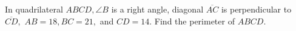 In quadrilateral $ABCD, \angle B$ is a right angle, diagonal $\overline{AC}$ is perpendicular to $\overline{CD},$ $AB=18, BC=21,$ and $CD=14.$  Find the perimeter of $ABCD$.